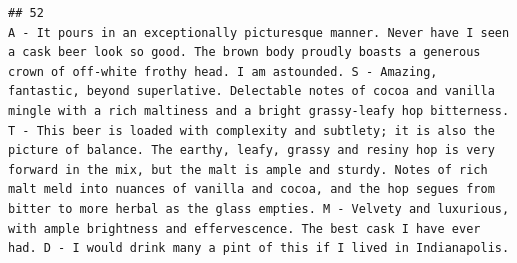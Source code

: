 \documentclass[
  a4paper,
]{article}
\begin{document}
\begin{verbatim}
## 52                                                                                                                                                                                                                                                                                                                                                                                                                                                                                                                                                                                                                                                                                                                                                                                                                                                                                                                                 A - It pours in an exceptionally picturesque manner. Never have I seen a cask beer look so good. The brown body proudly boasts a generous crown of off-white frothy head. I am astounded. S - Amazing, fantastic, beyond superlative. Delectable notes of cocoa and vanilla mingle with a rich maltiness and a bright grassy-leafy hop bitterness. T - This beer is loaded with complexity and subtlety; it is also the picture of balance. The earthy, leafy, grassy and resiny hop is very forward in the mix, but the malt is ample and sturdy. Notes of rich malt meld into nuances of vanilla and cocoa, and the hop segues from bitter to more herbal as the glass empties. M - Velvety and luxurious, with ample brightness and effervescence. The best cask I have ever had. D - I would drink many a pint of this if I lived in Indianapolis.

\end{verbatim}
\end{document}
